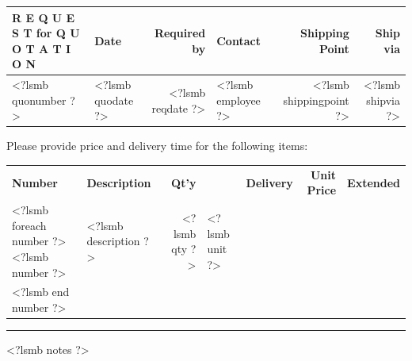 \documentclass[twoside]{scrartcl}
\begin{document}
\begin{tabularx}{\textwidth}{@{}lXrlrr@{}}
\textbf{R E Q U E S T for Q U O T A T I O N}
\hfill

\vspace{1cm}

\begin{tabularx}{\textwidth}{*{6}{|X}|} \hline
  \textbf{RFQ \#} & \textbf{Date} & \textbf{Required by} & \textbf{Contact} & \textbf{Shipping Point} & \textbf{Ship via} \\ [0.5ex]
  \hline
  <?lsmb quonumber ?> & <?lsmb quodate ?> & <?lsmb reqdate ?> & <?lsmb employee ?> & <?lsmb shippingpoint ?> & <?lsmb shipvia ?> \\
  \hline
\end{tabularx}

\vspace{1cm}

Please provide price and delivery time for the following items:

\vspace{1cm}

\begin{tabularx}{\textwidth}{@{}lXrllrr@{}}
  \textbf{Number} & \textbf{Description} & \textbf{Qt'y} & &
  \textbf{Delivery} & \textbf{Unit Price} & \textbf{Extended} \\
<?lsmb foreach number ?>
  <?lsmb number ?> & <?lsmb description ?> & <?lsmb qty ?> & <?lsmb unit ?> \\
<?lsmb end number ?>
\end{tabularx}


\parbox{\textwidth}{
\rule{\textwidth}{2pt}

\hfill

<?lsmb notes ?>

}
\end{document}
